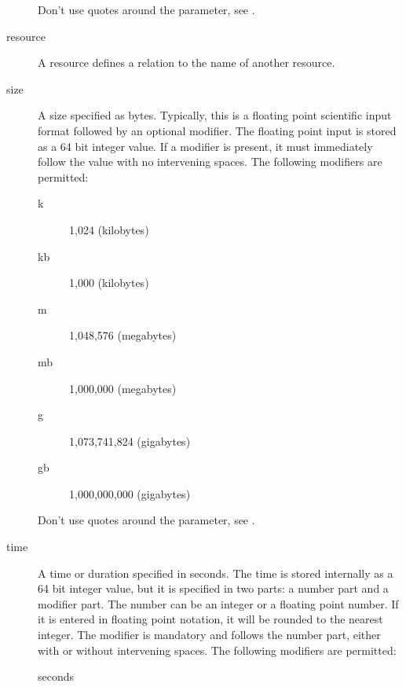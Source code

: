 \begin{description}
    Don't use quotes around the parameter, see .


\item [resource]
    \label{DataTypeRes}
A resource defines a relation to the name of another resource.


\item [size]
    \label{DataTypeSize}
    \label{Size1}
A size specified as bytes. Typically, this is  a floating point scientific
input format followed by an optional modifier. The  floating point input is
stored as a 64 bit integer value.  If a modifier is present, it must
immediately follow the  value with no intervening spaces. The following
modifiers are permitted:

\begin{description}
\item [k]
   1,024 (kilobytes)

\item [kb]
   1,000 (kilobytes)

\item [m]
   1,048,576 (megabytes)

\item [mb]
   1,000,000 (megabytes)

\item [g]
   1,073,741,824 (gigabytes)

\item [gb]
   1,000,000,000 (gigabytes)
\end{description}

    Don't use quotes around the parameter, see .


\item [time]
    \label{DataTypeTime}
    \label{Time}
A time or duration specified in seconds.  The time is stored internally as
a 64 bit integer value, but it is specified in two parts: a number part and
a modifier part.  The number can be an integer or a floating point number.
If it is entered in floating point notation, it will be rounded to the
nearest integer.  The modifier is mandatory and follows the number part,
either with or without intervening spaces.  The following modifiers are
permitted:

\begin{description}

\item [seconds]


\end{description}
\end{description}
